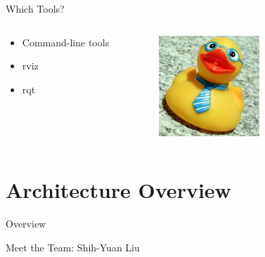 \documentclass[aspectratio=43]{beamer}
\begin{document}
\begin{frame}{Which Tools?}
\begin{columns}
	\begin{column}{0.55\textwidth}
		\begin{itemize}
			\item Command-line tools
                          \item rviz
                          \item rqt
		\end{itemize} 
        \end{column} 
        \begin{column}{0.45\textwidth} 
          \centering 
          \includegraphics[width=0.5\textwidth]{fig/yay-duckie.jpg} 
        \end{column}
\end{columns}

\end{frame}


\section{Architecture Overview}
\begin{frame}[label=overview]{Overview}
	\tableofcontents[sectionstyle=show/shaded,subsectionstyle=show/shaded/shaded]
\end{frame}

\begin{frame}{Meet the Team: Shih-Yuan Liu}
\end{frame}
\end{document}
